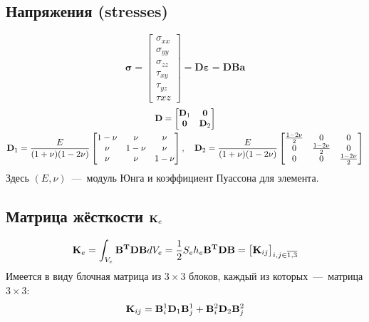 \documentclass[12pt,a4paper,fleqn]{article}
\begin{document}
	\subsection{Напряжения (stresses)}
		\begin{equation}\label{stress}
			\mathbf{\sigma} = \begin{bmatrix} \sigma_{xx} \\ \sigma_{yy} \\ \sigma_{zz} \\ \tau_{xy} \\ \tau_{yz} \\ \tau{xz}  \end{bmatrix} 
				= \mathbf{D \varepsilon} = \mathbf{DBa}
		\end{equation}
		\begin{gather}
			\mathbf{D} = 
				\begin{bmatrix}
					\mathbf{D}_1 	& \mathbf{0}	\\
					\mathbf{0}	& \mathbf{D}_2
				\end{bmatrix} \\ \notag
			\mathbf{D}_1 = \frac{E}{(1 + \nu)(1 - 2\nu)}
				\begin{bmatrix}
					1 - \nu 	& \nu 		& \nu \\
					\nu 		& 1 - \nu  	& \nu \\
					\nu		& \nu		& 1 - \nu
				\end{bmatrix}, \quad
			\mathbf{D}_2 = \frac{E}{(1 + \nu)(1 - 2\nu)}
				\begin{bmatrix}
					\frac{1-2\nu}2 	& 0 		& 0 \\
					0 		& \frac{1-2\nu}2& 0 \\
					0		& 0		& \frac{1-2\nu}2
				\end{bmatrix}
		\end{gather}
		Здесь $(E, \nu)$~---~модуль Юнга и коэффициент Пуассона для элемента.
	\subsection{Матрица жёсткости $\mathbf{K}_e$}
		\begin{equation}
			\mathbf{K}_e = \int_{V_e}{\mathbf{B^TDB}}dV_e = \frac12 S_e h_e 	\mathbf{B^TDB} 
				= \begin{bmatrix}
					\mathbf{K}_{ij}
					\end{bmatrix}_{i, j \in \overline{1,3}}
		\end{equation}
		Имеется в виду блочная матрица из $3\times3$ блоков, каждый из которых~---~матрица $3\times3$:
		\begin{equation}
			\mathbf{K}_{ij} = \mathbf{B}_i^1\mathbf{D}_1\mathbf{B}_j^1 +
						\mathbf{B}_i^2\mathbf{D}_2\mathbf{B}_j^2 
		\end{equation}
\end{document}
